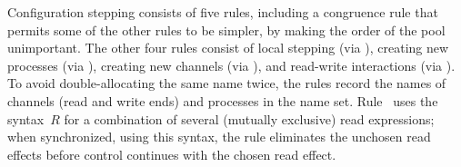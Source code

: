 Configuration stepping consists of five rules, including a congruence
rule  that permits some of the other rules to be simpler,
by making the order of the pool unimportant.
%
The other four rules consist of local stepping (via ),
creating new processes (via ),
creating new channels (via ),
and read-write interactions (via ).
%
To avoid double-allocating the same name twice, the rules record the
names of channels (read and write ends) and processes in the name set.
%
Rule~ uses the syntax~$R$ for a combination of several (mutually exclusive) read expressions; when synchronized, 
using this syntax, the rule eliminates the unchosen read effects before control continues with the chosen read effect.



